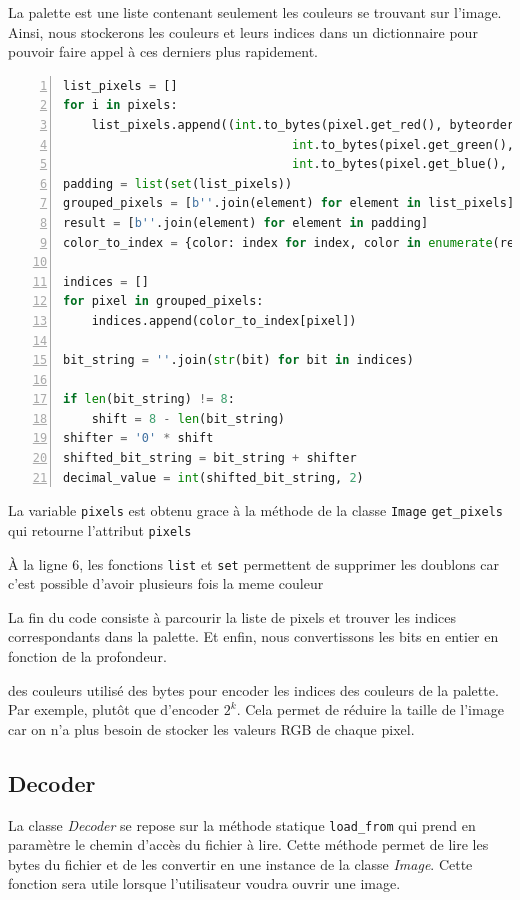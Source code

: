 \documentclass[utf8]{article}
\begin{document}
La palette est une liste contenant seulement les couleurs se trouvant sur l'image. Ainsi, nous stockerons les couleurs et leurs indices dans un dictionnaire pour pouvoir faire appel à ces derniers plus rapidement.

\begin{lstlisting}[language=Python, basicstyle=\small, numbers=left]
list_pixels = []
for i in pixels: 
	list_pixels.append((int.to_bytes(pixel.get_red(), byteorder='little'),
                                int.to_bytes(pixel.get_green(), byteorder='little'),
                                int.to_bytes(pixel.get_blue(), byteorder='little'))
padding = list(set(list_pixels))  
grouped_pixels = [b''.join(element) for element in list_pixels]
result = [b''.join(element) for element in padding]
color_to_index = {color: index for index, color in enumerate(result)}

indices = []
for pixel in grouped_pixels:   	
	indices.append(color_to_index[pixel])

bit_string = ''.join(str(bit) for bit in indices)

if len(bit_string) != 8:  
	shift = 8 - len(bit_string)
shifter = '0' * shift
shifted_bit_string = bit_string + shifter
decimal_value = int(shifted_bit_string, 2)

\end{lstlisting}

La variable \texttt{pixels} est obtenu grace à la méthode de la classe \texttt{Image} \texttt{get_pixels} qui retourne l'attribut \texttt{pixels}

À la ligne 6, les fonctions \texttt{list} et \texttt{set} permettent de supprimer les doublons car c'est possible d'avoir plusieurs fois la meme couleur

La fin du code consiste à parcourir la liste de pixels et trouver les indices correspondants dans la palette. Et enfin, nous convertissons les bits en entier  en fonction de la profondeur.

des couleurs utilisé des bytes pour encoder les indices des couleurs de la palette. Par exemple, plutôt que d'encoder $2^k$. Cela permet de réduire la taille de l'image car on n'a plus besoin de stocker les valeurs RGB de chaque pixel.

\subsection{Decoder}
La classe \textit{Decoder} se repose sur la méthode statique \texttt{load_from} qui prend en paramètre le chemin d'accès du fichier à lire. Cette méthode permet de lire les bytes du fichier et de les convertir en une instance de la classe \textit{Image}. Cette fonction sera utile lorsque l'utilisateur voudra ouvrir une image.
\end{document}
